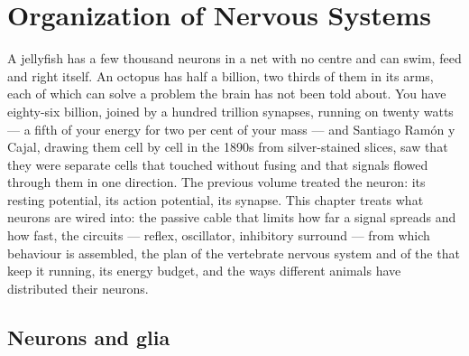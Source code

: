 \chapter{Organization of Nervous Systems}\label{ch:b3:nervous-systems}

A jellyfish has a few thousand neurons in a net with no centre and can
swim, feed and right itself. An octopus has half a billion, two thirds
of them in its arms, each of which can solve a problem the brain has
not been told about. You have eighty-six billion, joined by a hundred
trillion synapses, running on twenty watts --- a fifth of your energy
for two per cent of your mass --- and Santiago Ramón y Cajal, drawing
them cell by cell in the 1890s from silver-stained slices, saw that
they were separate cells that touched without fusing and that signals
flowed through them in one direction. The previous volume treated the
neuron: its resting potential, its action potential, its synapse. This
chapter treats what neurons are wired into: the passive cable that
limits how far a signal spreads and how fast, the circuits --- reflex,
oscillator, inhibitory surround --- from which behaviour is assembled,
the plan of the vertebrate nervous system and of the  that keep it
running, its energy budget, and the ways different animals have
distributed their neurons.

\section{Neurons and glia}

